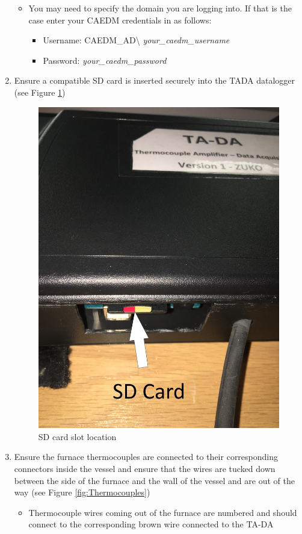 \documentclass[letterpaper,11pt]{article}
\begin{document}
\begin{enumerate}
\begin{itemize}
        \item You may need to specify the domain you are logging into. If that 
            is the case enter your CAEDM credentials in as follows:
            \begin{itemize}
            \item Username: CAEDM\_AD\textbackslash
            \textit{your\_caedm\_username}
            \item Password: \textit{your\_caedm\_password}
            \end{itemize}
        
        
        \end{itemize}
    
    \item Ensure a compatible SD card is inserted securely into the TADA 
        datalogger (see Figure \ref{fig:sd_card_reader})
        
\begin{figure}[H]
\centering
\includegraphics[width=.3\textwidth]{sd_card_reader.jpg}
\caption{SD card slot location}
\label{fig:sd_card_reader}
\end{figure}
        
    \item Ensure the furnace thermocouples are connected to their corresponding
        connectors inside the vessel and ensure that the wires are tucked down 
        between the side of the furnace and the wall of the vessel and are out 
        of the way (see Figure \ref{fig:Thermocouples})
        \begin {itemize}
        \item Thermocouple wires coming out of the furnace are numbered and
            should connect to the corresponding brown wire connected to 
            the TA-DA
        \end{itemize}
        

\end{enumerate}
\end{document}
